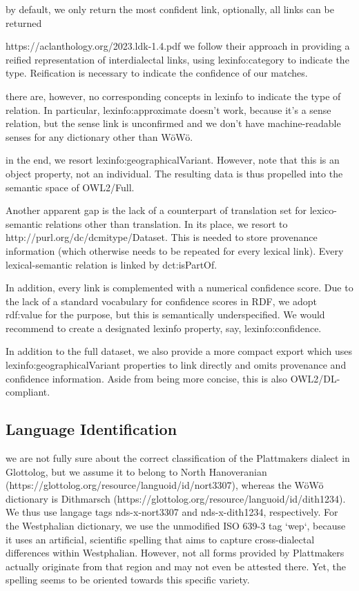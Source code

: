 \documentclass{article}
\begin{document}
by default, we only return the most confident link, optionally, all links can be returned

https://aclanthology.org/2023.ldk-1.4.pdf
we follow their approach in providing a reified representation of interdialectal links, using lexinfo:category to indicate the type. Reification is necessary to indicate the confidence of our matches.

there are, however, no corresponding concepts in lexinfo to indicate the type of relation. In particular, lexinfo:approximate doesn't work, because it's a sense relation, but the sense link is unconfirmed and we don't have machine-readable senses for any dictionary other than WöWö.

in the end, we resort lexinfo:geographicalVariant. However, note that this is an object property, not an individual. The resulting data is thus propelled into the semantic space of OWL2/Full.

Another apparent gap is the lack of a counterpart of translation set for lexico-semantic relations other than translation. In its place, we resort to  http://purl.org/dc/dcmitype/Dataset. This is needed to store provenance information (which otherwise needs to be repeated for every lexical link). Every lexical-semantic relation is linked by dct:isPartOf. 

In addition, every link is complemented with a numerical confidence score. Due to the lack of a standard vocabulary for confidence scores in RDF, we adopt rdf:value for the purpose, but this is semantically underspecified. We would recommend to create a designated lexinfo property, say, lexinfo:confidence.


In addition to the full dataset, we also provide a more compact export which uses lexinfo:geographicalVariant properties to link directly and omits provenance and confidence information. Aside from being more concise, this is also OWL2/DL-compliant. 

\subsection{Language Identification}

we are not fully sure about the correct classification of the Plattmakers dialect in Glottolog, but we assume it to belong to North Hanoveranian (https://glottolog.org/resource/languoid/id/nort3307), whereas the WöWö dictionary is Dithmarsch (https://glottolog.org/resource/languoid/id/dith1234). We thus use langage tags nds-x-nort3307 and nds-x-dith1234, respectively. For the Westphalian dictionary, we use the unmodified ISO 639-3 tag `wep`, because it uses an artificial, scientific spelling that aims to capture cross-dialectal differences within Westphalian.
However, not all forms provided by Plattmakers actually originate from that region and may not even be attested there. Yet, the spelling seems to be oriented towards this specific variety.
\end{document}
